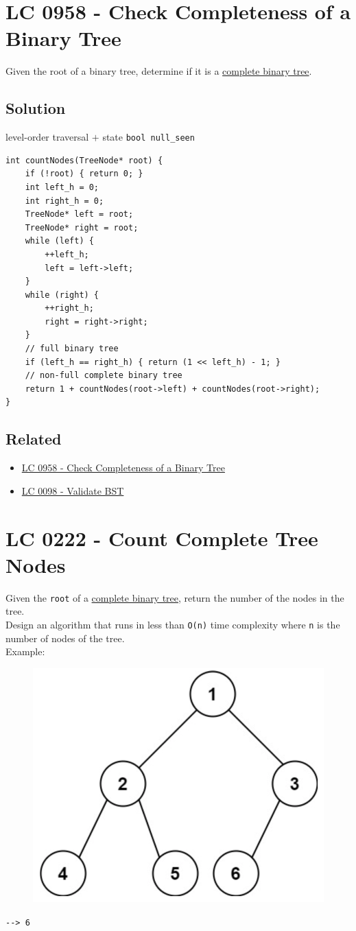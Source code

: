 \section{LC 0958 - Check Completeness of a Binary Tree}\label{lc0958}
Given the root of a binary tree, determine if it is a \ul{complete binary tree}.

\subsection*{Solution}
level-order traversal $+$ state {\colorbox{CodeBackground}{\lstinline|bool null_seen|}}
\begin{lstlisting}
int countNodes(TreeNode* root) {
	if (!root) { return 0; }
	int left_h = 0;
	int right_h = 0;
	TreeNode* left = root;
	TreeNode* right = root;
	while (left) {
		++left_h;
		left = left->left;
	}
	while (right) {
		++right_h;
		right = right->right;
	}
	// full binary tree
	if (left_h == right_h) { return (1 << left_h) - 1; }
	// non-full complete binary tree
	return 1 + countNodes(root->left) + countNodes(root->right);
}
\end{lstlisting}

\subsection*{Related}
\begin{itemize}
	\item \hyperref[lc0958]{LC 0958 - Check Completeness of a Binary Tree}
	\item \hyperref[lc0098]{LC 0098 - Validate BST}
\end{itemize}

\section{LC 0222 - Count Complete Tree Nodes}
Given the {\colorbox{CodeBackground}{\lstinline|root|}} of a \ul{complete binary tree}, return the number of the nodes in the tree.\\

Design an algorithm that runs in less than {\colorbox{CodeBackground}{\lstinline|O(n)|}} time complexity where {\colorbox{CodeBackground}{\lstinline|n|}} is the number of nodes of the tree.\\

Example:
\begin{figure}[H]
	\centering
	\includegraphics[width=0.32\linewidth]{images/lc0222_example}
	\label{fig:lc0222example}
\end{figure}
{\colorbox{CodeBackground}{\lstinline|--> 6|}}

